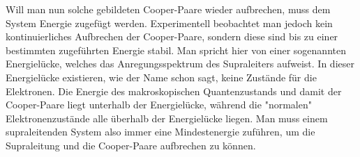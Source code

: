 Will man nun solche gebildeten Cooper-Paare wieder aufbrechen, muss dem System Energie zugefügt werden. Experimentell beobachtet man jedoch kein kontinuierliches Aufbrechen der Cooper-Paare, sondern diese sind bis zu einer bestimmten zugeführten Energie stabil. Man spricht hier von einer sogenannten Energielücke, welches das Anregungsspektrum des Supraleiters aufweist. In dieser Energielücke existieren, wie der Name schon sagt, keine Zustände für die Elektronen. Die Energie des makroskopischen Quantenzustands und damit der Cooper-Paare liegt unterhalb der Energielücke, während die "normalen" Elektronenzustände alle überhalb der Energielücke liegen. Man muss einem supraleitenden System also immer eine Mindestenergie zuführen, um die Supraleitung und die Cooper-Paare aufbrechen zu können.
